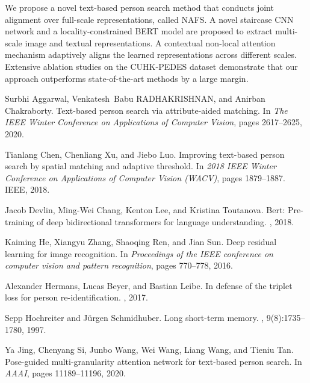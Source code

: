 \documentclass[final]{cvpr}
\begin{document}
We propose a novel text-based person search method that conducts joint alignment over full-scale representations, called NAFS.
A novel staircase CNN network and a locality-constrained BERT model are proposed to extract multi-scale image and textual representations. A contextual non-local attention mechanism adaptively aligns the learned representations across different scales. Extensive ablation studies on the CUHK-PEDES dataset demonstrate that our approach outperforms state-of-the-art methods by a large margin.

\begin{thebibliography}{10}\itemsep=-1pt

Surbhi Aggarwal, Venkatesh~Babu RADHAKRISHNAN, and Anirban Chakraborty.
\newblock Text-based person search via attribute-aided matching.
\newblock In {\em The IEEE Winter Conference on Applications of Computer
  Vision}, pages 2617--2625, 2020.

Tianlang Chen, Chenliang Xu, and Jiebo Luo.
\newblock Improving text-based person search by spatial matching and adaptive
  threshold.
\newblock In {\em 2018 IEEE Winter Conference on Applications of Computer
  Vision (WACV)}, pages 1879--1887. IEEE, 2018.

Jacob Devlin, Ming-Wei Chang, Kenton Lee, and Kristina Toutanova.
\newblock Bert: Pre-training of deep bidirectional transformers for language
  understanding.
, 2018.

Kaiming He, Xiangyu Zhang, Shaoqing Ren, and Jian Sun.
\newblock Deep residual learning for image recognition.
\newblock In {\em Proceedings of the IEEE conference on computer vision and
  pattern recognition}, pages 770--778, 2016.

Alexander Hermans, Lucas Beyer, and Bastian Leibe.
\newblock In defense of the triplet loss for person re-identification.
, 2017.

Sepp Hochreiter and J{\"u}rgen Schmidhuber.
\newblock Long short-term memory.
, 9(8):1735--1780, 1997.

Ya Jing, Chenyang Si, Junbo Wang, Wei Wang, Liang Wang, and Tieniu Tan.
\newblock Pose-guided multi-granularity attention network for text-based person
  search.
\newblock In {\em AAAI}, pages 11189--11196, 2020.


\end{thebibliography}
\end{document}
